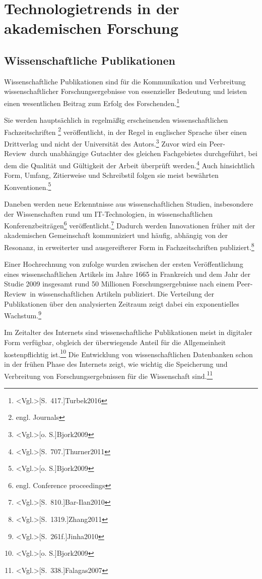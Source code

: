 \section{Technologietrends in der akademischen Forschung}
\subsection{Wissenschaftliche Publikationen}\label{sec:acad_pub}
Wissenschaftliche Publikationen sind für die Kommunikation und Verbreitung wissenschaftlicher Forschungsergebnisse von essenzieller Bedeutung und leisten einen wesentlichen Beitrag zum Erfolg des Forschenden.\footnote{\citeNP<Vgl.>[S.~417.]{Turbek2016}}

Sie werden hauptsächlich in regelmäßig erscheinenden wissenschaftlichen Fachzeitschriften \footnote{engl. Journals} veröffentlicht, in der Regel in englischer Sprache über einen Drittverlag und nicht der Universität des Autors.\footnote{\citeNP<Vgl.>[o. S.]{Bjork2009}} Zuvor wird ein \glqq Peer-Review\grqq~durch unabhängige Gutachter des gleichen Fachgebietes durchgeführt, bei dem die Qualität und Gültigkeit der Arbeit überprüft werden.\footnote{\citeNP<Vgl.>[S.~707.]{Thurner2011}} Auch hinsichtlich Form, Umfang, Zitierweise und Schreibstil folgen sie meist bewährten Konventionen.\footnote{\citeNP<Vgl.>[o. S.]{Bjork2009}}

Daneben werden neue Erkenntnisse aus wissenschaftlichen Studien, insbesondere der Wissenschaften rund um IT-Technologien, in wissenschaftlichen Konferenzbeiträgen\footnote{engl. Conference proceedings} veröffentlicht.\footnote{\citeNP<Vgl.>[S.~810.]{Bar-Ilan2010}} Dadurch werden Innovationen früher mit der akademischen Gemeinschaft kommuniziert und häufig, abhängig von der Resonanz, in erweiterter und ausgereifterer Form in Fachzeitschriften publiziert.\footnote{\citeNP<Vgl.>[S.~1319.]{Zhang2011}}

Einer Hochrechnung von  zufolge wurden zwischen der ersten Veröffentlichung eines wissenschaftlichen Artikels im Jahre 1665 in Frankreich und dem Jahr der Studie 2009 insgesamt rund 50 Millionen Forschungsergebnisse nach einem \glqq Peer-Review\grqq~in wissenschaftlichen Artikeln publiziert. Die Verteilung der Publikationen über den analysierten Zeitraum zeigt dabei ein exponentielles Wachstum.\footnote{\citeNP<Vgl.>[S.~261f.]{Jinha2010}}

Im Zeitalter des Internets sind wissenschaftliche Publikationen meist in digitaler Form verfügbar, obgleich der überwiegende Anteil für die Allgemeinheit kostenpflichtig ist.\footnote{\citeNP<Vgl.>[o. S.]{Bjork2009}} Die Entwicklung von wissenschaftlichen Datenbanken schon in der frühen Phase des Internets zeigt, wie wichtig die Speicherung und Verbreitung von Forschungsergebnissen für die Wissenschaft sind.\footnote{\citeNP<Vgl.>[S.~338.]{Falagas2007}}

